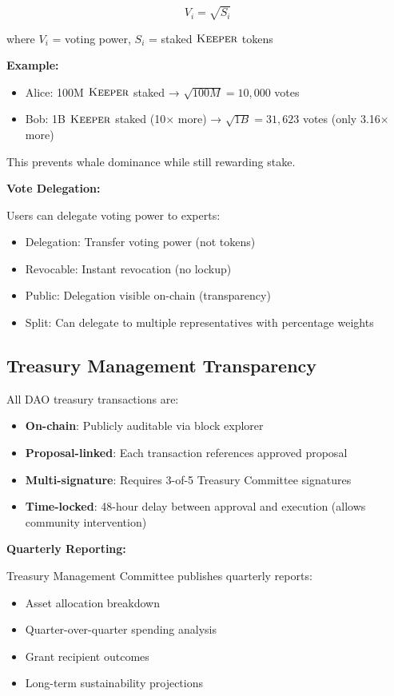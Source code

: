 \documentclass[11pt,letterpaper]{article}
\theoremstyle{definition}
\theoremstyle{remark}
\newcommand{\KEEPER}{\textsc{Keeper}}
\begin{document}
\begin{equation}
V_i = \sqrt{S_i}
\end{equation}

where $V_i$ = voting power, $S_i$ = staked $\KEEPER$ tokens

\textbf{Example:}
\begin{itemize}
\item Alice: 100M $\KEEPER$ staked → $\sqrt{100M} = 10,000$ votes
\item Bob: 1B $\KEEPER$ staked (10× more) → $\sqrt{1B} = 31,623$ votes (only 3.16× more)
\end{itemize}

This prevents whale dominance while still rewarding stake.

\textbf{Vote Delegation:}

Users can delegate voting power to experts:
\begin{itemize}
\item Delegation: Transfer voting power (not tokens)
\item Revocable: Instant revocation (no lockup)
\item Public: Delegation visible on-chain (transparency)
\item Split: Can delegate to multiple representatives with percentage weights
\end{itemize}

\subsection{Treasury Management Transparency}

All DAO treasury transactions are:
\begin{itemize}
\item \textbf{On-chain}: Publicly auditable via block explorer
\item \textbf{Proposal-linked}: Each transaction references approved proposal
\item \textbf{Multi-signature}: Requires 3-of-5 Treasury Committee signatures
\item \textbf{Time-locked}: 48-hour delay between approval and execution (allows community intervention)
\end{itemize}

\textbf{Quarterly Reporting:}

Treasury Management Committee publishes quarterly reports:
\begin{itemize}
\item Asset allocation breakdown
\item Quarter-over-quarter spending analysis
\item Grant recipient outcomes
\item Long-term sustainability projections
\end{itemize}
\end{document}
